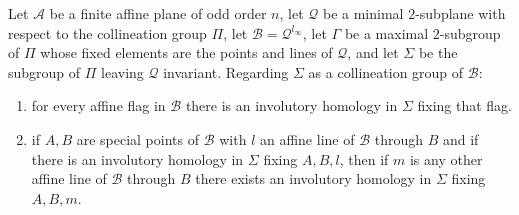 Let $\mathcal{A}$ be a finite affine plane of odd order $n$, let $\mathcal{Q}$ be a minimal $2$-subplane with respect to the collineation group $\Pi$, let $\mathcal{B} = \mathcal{Q}^{l_\infty}$, let $\Gamma$ be a maximal $2$-subgroup of $\Pi$ whose fixed elements are the points and lines of $\mathcal{Q}$, and let $\Sigma$ be the subgroup of $\Pi$ leaving $\mathcal{Q}$ invariant. Regarding $\Sigma$ as a collineation group of $\mathcal{B}$:

\begin{enumerate}
\item[(i)] for every affine flag in $\mathcal{B}$ there is an involutory homology in $\Sigma$ fixing that flag.
\item[(ii)] if $A, B$ are special points of $\mathcal{B}$ with $l$ an affine line of $\mathcal{B}$ through $B$ and if there is an involutory homology in $\Sigma$ fixing $A, B, l$, then if $m$ is any other affine line of $\mathcal{B}$ through $B$ there exists an involutory homology in $\Sigma$ fixing $A, B, m$.
\end{enumerate}
